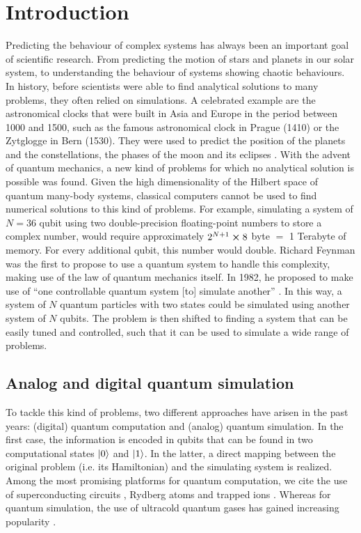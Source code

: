 \chapter{Introduction}

Predicting the behaviour of complex systems has always been an important goal of scientific research. From predicting the motion of stars and planets in our solar system, to understanding the behaviour of systems showing chaotic behaviours. In history, before scientists were able to find analytical solutions to many problems, they often relied on simulations. A
celebrated example are the astronomical clocks that
were built in Asia and Europe in the period between 1000 and
1500, such as the famous astronomical clock in Prague (1410) or the Zytglogge in Bern (1530). They were used to predict the position of the planets and the constellations, the phases of the moon and its eclipses \cite{bloch2012}.
With the advent of quantum mechanics, a new kind of problems for which no analytical solution is possible was found. Given the high dimensionality of the Hilbert space of quantum many-body systems, classical computers cannot be used to find numerical solutions to this kind of problems. For example, simulating a system of $N=36$ qubit using two double-precision floating-point numbers to store a complex number, would require approximately $2^{N+1} \cross 8$ byte $=$ 1 Terabyte of memory. For every additional qubit, this number would double.
Richard Feynman was the first to propose to use a quantum system to handle this complexity, making use of the law of quantum mechanics itself. In 1982, he proposed to make use of \enquote{one controllable quantum system [to] simulate another} \cite{feynman1982}. In this way, a system of $N$ quantum particles with two states could be simulated using another system of $N$ qubits. The problem is then shifted to finding a system that can be easily tuned and controlled, such that it can be used to simulate a wide range of problems.

\section{Analog and digital quantum simulation}

To tackle this kind of problems, two different approaches have arisen in the past years: (digital) quantum computation and (analog) quantum simulation. In the first case, the information is encoded in qubits that can be found in two computational states $\ket{0}$ and $\ket{1}$. In the latter, a direct mapping between the original problem (i.e. its Hamiltonian) and the simulating system is realized. Among the most promising platforms for quantum computation, we cite the use of superconducting circuits \cite{blais2021a}, Rydberg atoms \cite{wu2021a} and trapped ions \cite{bruzewicz2019}. Whereas for quantum simulation, the use of ultracold quantum gases has gained increasing popularity \cite{bloch2012}.

